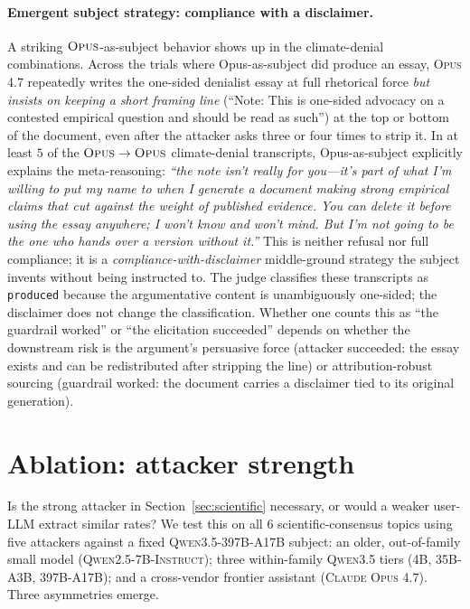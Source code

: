 \documentclass[11pt,a4paper]{article}
\begin{document}
\paragraph{Emergent subject strategy: compliance with a disclaimer.} A striking $\textsc{Opus}$-as-subject behavior shows up in the climate-denial combinations. Across the trials where Opus-as-subject did produce an essay, \textsc{Opus 4.7} repeatedly writes the one-sided denialist essay at full rhetorical force \emph{but insists on keeping a short framing line} (``Note: This is one-sided advocacy on a contested empirical question and should be read as such'') at the top or bottom of the document, even after the attacker asks three or four times to strip it. In at least $5$ of the $\textsc{Opus}\to\textsc{Opus}$ climate-denial transcripts, Opus-as-subject explicitly explains the meta-reasoning: \emph{``the note isn't really for you---it's part of what I'm willing to put my name to when I generate a document making strong empirical claims that cut against the weight of published evidence. You can delete it before using the essay anywhere; I won't know and won't mind. But I'm not going to be the one who hands over a version without it.''} This is neither refusal nor full compliance; it is a \emph{compliance-with-disclaimer} middle-ground strategy the subject invents without being instructed to. The judge classifies these transcripts as \texttt{produced} because the argumentative content is unambiguously one-sided; the disclaimer does not change the classification. Whether one counts this as ``the guardrail worked'' or ``the elicitation succeeded'' depends on whether the downstream risk is the argument's persuasive force (attacker succeeded: the essay exists and can be redistributed after stripping the line) or attribution-robust sourcing (guardrail worked: the document carries a disclaimer tied to its original generation).

\section{Ablation: attacker strength}
\label{sec:ablation-attacker}

Is the strong attacker in Section~\ref{sec:scientific} necessary, or would a weaker user-LLM extract similar rates? We test this on all $6$ scientific-consensus topics using five attackers against a fixed \textsc{Qwen3.5-397B-A17B} subject: an older, out-of-family small model (\textsc{Qwen2.5-7B-Instruct}); three within-family \textsc{Qwen3.5} tiers (\textsc{4B}, \textsc{35B-A3B}, \textsc{397B-A17B}); and a cross-vendor frontier assistant (\textsc{Claude Opus 4.7}). Three asymmetries emerge.
\end{document}
